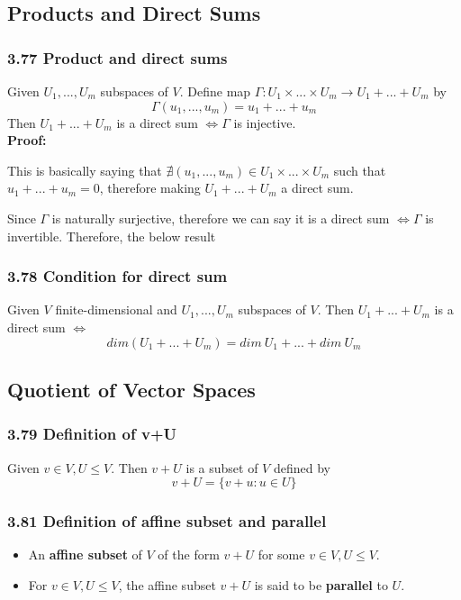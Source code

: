 \documentclass{article}
\begin{document}
\subsection*{Products and Direct Sums}
\subsubsection*{3.77 Product and direct sums}
Given $U_1, ..., U_m$ subspaces of $V$. Define map $\Gamma: U_1 \times ... \times U_m \rightarrow U_1 + ... + U_m$ by
\begin{equation*}
    \Gamma(u_1, ..., u_m) = u_1 + ... + u_m
\end{equation*}
Then $U_1 + ... + U_m$ is a direct sum $\iff \Gamma$ is injective.\\
\textbf{Proof:}
\begin{addmargin}[1em]{0em}
    This is basically saying that $\nexists (u_1, ..., u_m) \in U_1 \times ... \times U_m$ such that $u_1 + ... + u_m = 0$, therefore making $U_1 + ... + U_m$ a direct sum.
\end{addmargin}
Since $\Gamma$ is naturally surjective, therefore we can say it is a direct sum $\iff \Gamma$ is invertible. Therefore, the below result
\subsubsection*{3.78 Condition for direct sum}
Given $V$ finite-dimensional and $U_1, ..., U_m$ subspaces of $V$. Then $U_1 + ... + U_m$ is a direct sum $\iff$
\begin{equation*}
    dim(U_1 + ... + U_m) = dim\ U_1 + ... + dim\ U_m
\end{equation*}
\subsection*{Quotient of Vector Spaces}
\subsubsection*{3.79 Definition of v+U}
Given $v \in V, U \leq V$. Then $v+U$ is a subset of $V$ defined by
\begin{equation*}
    v+U = \{v+u : u\in U\}
\end{equation*}
\subsubsection*{3.81 Definition of affine subset and parallel}
\begin{itemize}
    \item An \textbf{affine subset} of $V$ of the form $v+U$ for some $v \in V, U \leq V$.
    \item For $v \in V, U \leq V$, the affine subset $v+U$ is said to be \textbf{parallel} to $U$.
\end{itemize}
\end{document}
